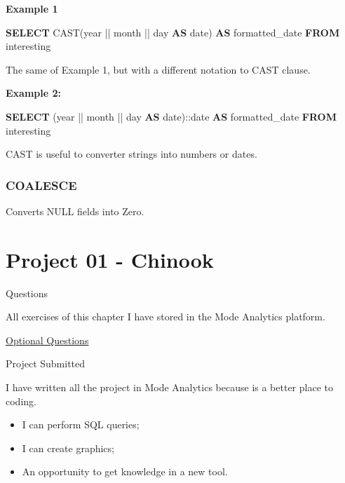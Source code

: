 \documentclass[]{book}
\newenvironment{Shaded}{\begin{snugshade}}{\end{snugshade}}
\newcommand{\KeywordTok}[1]{\textcolor[rgb]{0.13,0.29,0.53}{\textbf{#1}}}
\newcommand{\DataTypeTok}[1]{\textcolor[rgb]{0.13,0.29,0.53}{#1}}
\newcommand{\CharTok}[1]{\textcolor[rgb]{0.31,0.60,0.02}{#1}}
\newcommand{\FunctionTok}[1]{\textcolor[rgb]{0.00,0.00,0.00}{#1}}
\newcommand{\NormalTok}[1]{#1}
\providecommand{\tightlist}{%
  \setlength{\itemsep}{0pt}\setlength{\parskip}{0pt}}
\begin{document}
\textbf{Example 1}

\begin{Shaded}
\begin{Highlighting}[]
\KeywordTok{SELECT} \FunctionTok{CAST}\NormalTok{(}\DataTypeTok{year}\NormalTok{ || }\DataTypeTok{month}\NormalTok{ || }\DataTypeTok{day} \KeywordTok{AS} \DataTypeTok{date}\NormalTok{) }\KeywordTok{AS}\NormalTok{ formatted_date}
\KeywordTok{FROM}\NormalTok{ interesting}
\end{Highlighting}
\end{Shaded}

The same of Example 1, but with a different notation to CAST clause.

\textbf{Example 2:}

\begin{Shaded}
\begin{Highlighting}[]
\KeywordTok{SELECT}\NormalTok{ (}\DataTypeTok{year}\NormalTok{ || }\DataTypeTok{month}\NormalTok{ || }\DataTypeTok{day} \KeywordTok{AS} \DataTypeTok{date}\NormalTok{):}\CharTok{:date} \KeywordTok{AS}\NormalTok{ formatted_date}
\KeywordTok{FROM}\NormalTok{ interesting}
\end{Highlighting}
\end{Shaded}

CAST is useful to converter strings into numbers or dates.

\subsubsection{COALESCE}\label{coalesce}

Converts NULL fields into Zero.

\section{Project 01 - Chinook}\label{project-01---chinook}

Questions

All exercises of this chapter I have stored in the Mode Analytics
platform.

\href{https://modeanalytics.com/ah_uyekita/reports/5e871f63f8b2}{Optional
Questions}

Project Submitted

I have written all the project in Mode Analytics because is a better
place to coding.

\begin{itemize}
\tightlist
\item
  I can perform SQL queries;
\item
  I can create graphics;
\item
  An opportunity to get knowledge in a new tool.
\end{itemize}
\end{document}
